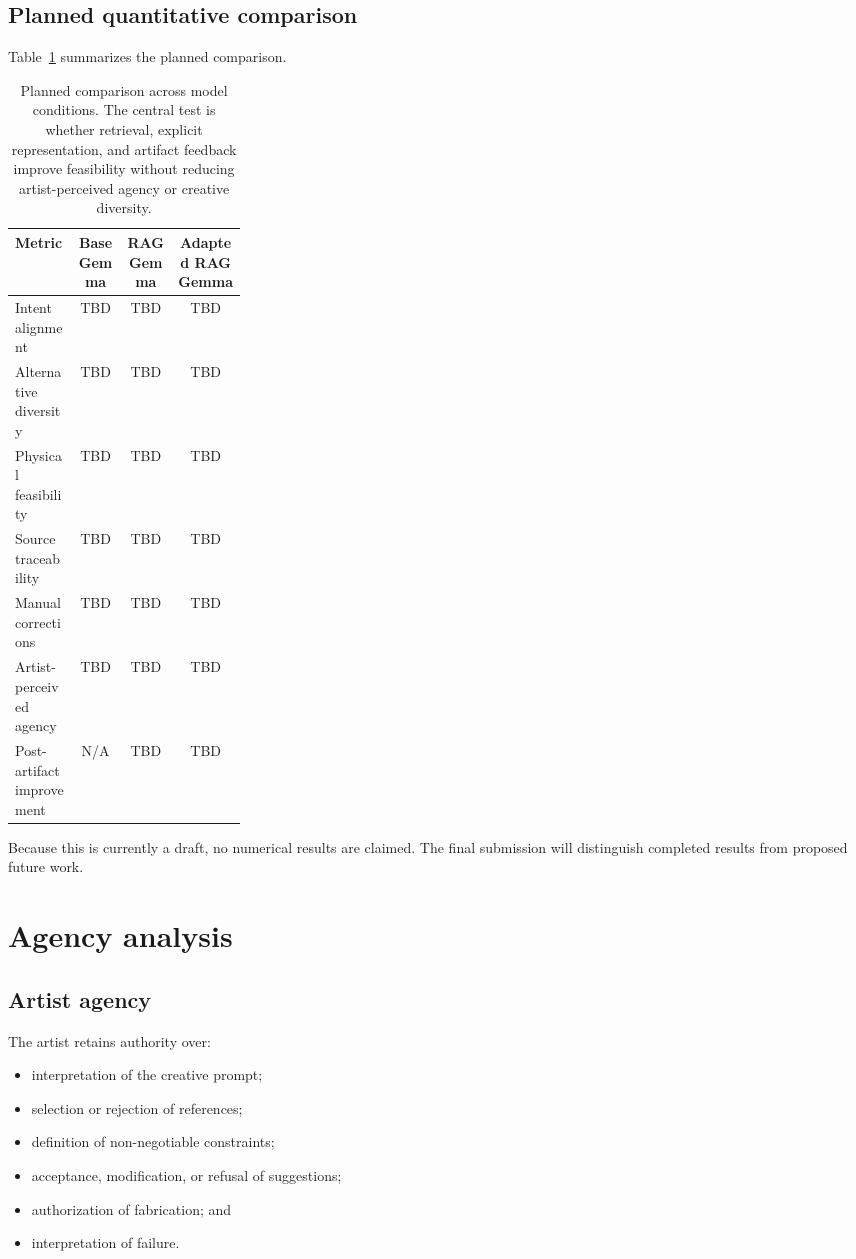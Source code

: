 \documentclass{article}
\begin{document}
\subsection{Planned quantitative comparison}

Table~\ref{tab:planned} summarizes the planned comparison.

\begin{table}[t]
\caption{
Planned comparison across model conditions. The central test is whether
retrieval, explicit representation, and artifact feedback improve feasibility
without reducing artist-perceived agency or creative diversity.
}
\label{tab:planned}
\centering
\small
\begin{tabular}{p{0.27\linewidth}ccc}
\toprule
Metric &
Base Gemma &
RAG Gemma &
Adapted RAG Gemma \\
\midrule
Intent alignment & TBD & TBD & TBD \\
Alternative diversity & TBD & TBD & TBD \\
Physical feasibility & TBD & TBD & TBD \\
Source traceability & TBD & TBD & TBD \\
Manual corrections & TBD & TBD & TBD \\
Artist-perceived agency & TBD & TBD & TBD \\
Post-artifact improvement & N/A & TBD & TBD \\
\bottomrule
\end{tabular}
\end{table}

Because this is currently a draft, no numerical results are claimed. The final
submission will distinguish completed results from proposed future work.

\section{Agency analysis}

\subsection{Artist agency}

The artist retains authority over:

\begin{itemize}[leftmargin=*]
    \item interpretation of the creative prompt;
    \item selection or rejection of references;
    \item definition of non-negotiable constraints;
    \item acceptance, modification, or refusal of suggestions;
    \item authorization of fabrication; and
    \item interpretation of failure.
\end{itemize}
\end{document}
